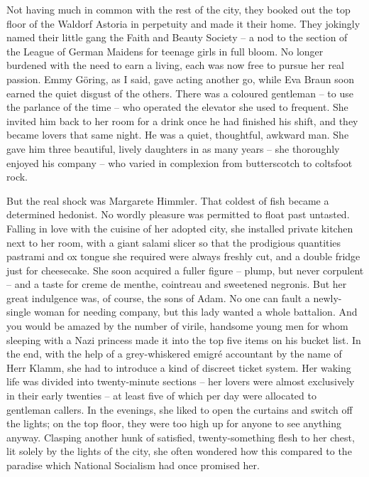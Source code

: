 Not having much in common with the rest of the city, they booked out the top floor of the Waldorf Astoria in perpetuity and made it their home. They jokingly named their little gang the Faith and Beauty Society -- a nod to the section of the League of German Maidens for teenage girls in full bloom. No longer burdened with the need to earn a living, each was now free to pursue her real passion. Emmy G\"oring, as I said, gave acting another go, while Eva Braun soon earned the quiet disgust of the others. There was a coloured gentleman -- to use the parlance of the time -- who operated the elevator she used to frequent. She invited him back to her room for a drink once he had finished his shift, and they became lovers that same night. He was a quiet, thoughtful, awkward man. She gave him three beautiful, lively daughters in as many years -- she thoroughly enjoyed his company -- who varied in complexion from butterscotch to coltsfoot rock.

But the real shock was Margarete Himmler. That coldest of fish became a determined hedonist. No wordly pleasure was permitted to float past untasted. Falling in love with the cuisine of her adopted city, she installed private kitchen next to her room, with a giant salami slicer so that the prodigious quantities pastrami and ox tongue she required were always freshly cut, and a double fridge just for cheesecake. She soon acquired a fuller figure -- plump, but never corpulent -- and a taste for creme de menthe, cointreau and sweetened negronis. But her great indulgence was, of course, the sons of Adam. No one can fault a newly-single woman for needing company, but this lady wanted a whole battalion. And you would be amazed by the number of virile, handsome young men for whom sleeping with a Nazi princess made it into the top five items on his bucket list. In the end, with the help of a grey-whiskered emigr\'e accountant by the name of Herr Klamm, she had to introduce a kind of discreet ticket system. Her waking life was divided into twenty-minute sections -- her lovers were almost exclusively in their early twenties -- at least five of which per day were allocated to gentleman callers. In the evenings, she liked to open the curtains and switch off the lights; on the top floor, they were too high up for anyone to see anything anyway. Clasping another hunk of satisfied, twenty-something flesh to her chest, lit solely by the lights of the city, she often wondered how this compared to the paradise which National Socialism had once promised her.


